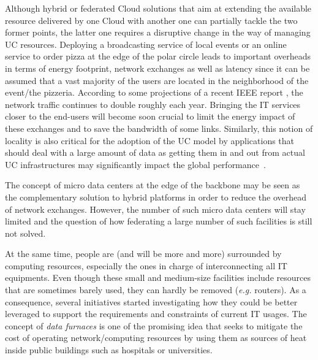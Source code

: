 Although hybrid or federated Cloud solutions \cite{armbrust:2010} that aim at extending
the available resource delivered by one Cloud  with another one
can partially tackle the two former points, the latter one requires a disruptive change in
the way of managing UC resources.  Deploying a broadcasting service of local events or an
online service to order pizza at the edge of the polar circle leads to important overheads
in terms of energy footprint, network exchanges as well as latency since it can be assumed
that a vast majority of the users are located in the neighborhood of the event/the
pizzeria.  According to some projections of a recent IEEE report
\cite{ieeenetreport:2012}, the network traffic continues to double roughly each
year. Bringing the IT services closer to the end-users will become soon crucial to limit
the energy impact of these exchanges and to save the bandwidth of some links. Similarly,
this notion of locality is also critical for the adoption of the UC model by applications
that should deal with a large amount of data as getting them in and out from actual UC
infrastructures may significantly impact the global performance~\cite{Fos11}. 

The concept of micro data centers at the edge of the backbone
\cite{greenberg:sigcomm09} may be seen as the complementary solution to hybrid
platforms in order to reduce the overhead of network exchanges.  However, the
number of such micro data centers will stay limited and the question of how
federating a large number of such facilities is still not solved.  

At the same time, people are (and will be more and more) surrounded by
computing resources, especially the ones in charge of interconnecting all IT
equipments.  Even though these small and medium-size facilities include
resources that are sometimes barely used, they can hardly be removed (\textit{e.g.} routers). As
a consequence, several initiatives started investigating how they could be
better leveraged to support the requirements and constraints of current IT
usages.  The concept of \emph{data furnaces} \cite{liu:hotcloud11} is one of
the promising idea that seeks to mitigate the cost of operating
network/computing resources by using them as sources of heat inside public
buildings such as hospitals or universities. 


